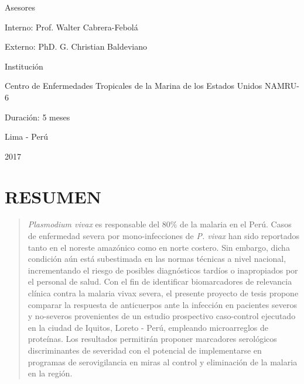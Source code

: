 \documentclass[]{article}
\begin{document}
\begin{centering}
\vspace{.3 cm}

Asesores

Interno: Prof. Walter Cabrera-Febolá

Externo: PhD. G. Christian Baldeviano

\vspace{.3 cm}

Institución

Centro de Enfermedades Tropicales de la Marina de los Estados Unidos 
NAMRU-6

\vspace{.3 cm}

Duración: 5 meses

\vspace{1 cm}

\Large
Lima - Perú


2017

\end{centering}

\vfill
\restoregeometry
\clearpage

\newpage

\tableofcontents

\newpage


\section*{RESUMEN}\label{resumen}

\begin{quote}
\emph{Plasmodium vivax} es responsable del 80\% de la malaria en el
Perú. Casos de enfermedad severa por mono-infecciones de \emph{P. vivax}
han sido reportados tanto en el noreste amazónico como en norte costero.
Sin embargo, dicha condición aún está subestimada en las normas técnicas
a nivel nacional, incrementando el riesgo de posibles diagnósticos
tardíos o inapropiados por el personal de salud. Con el fin de
identificar biomarcadores de relevancia clínica contra la malaria vivax
severa, el presente proyecto de tesis propone comparar la respuesta de
anticuerpos ante la infección en pacientes severos y no-severos
provenientes de un estudio prospectivo caso-control ejecutado en la
ciudad de Iquitos, Loreto - Perú, empleando microarreglos de proteínas.
Los resultados permitirán proponer marcadores serológicos discriminantes
de severidad con el potencial de implementarse en programas de
serovigilancia en miras al control y eliminación de la malaria en la
región.
\end{quote}
\end{document}
